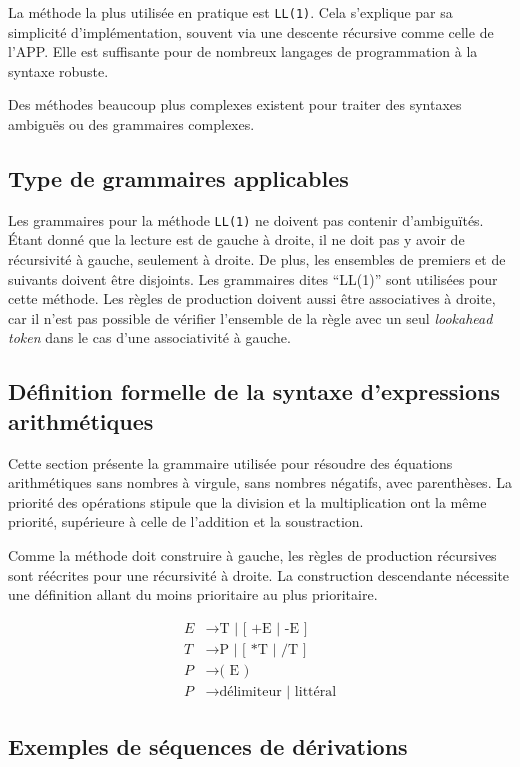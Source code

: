 La méthode la plus utilisée en pratique est \verb|LL(1)|. Cela s'explique par
sa simplicité d'implémentation, souvent via une descente récursive comme
celle de l'APP. Elle est suffisante pour de nombreux langages de
programmation à la syntaxe robuste.

Des méthodes beaucoup plus complexes existent pour traiter des syntaxes
ambiguës ou des grammaires complexes.

\subsection{Type de grammaires applicables}

Les grammaires pour la méthode \verb|LL(1)| ne doivent pas contenir
d’ambiguïtés. Étant donné que la lecture est de gauche à droite, il ne doit
pas y avoir de récursivité à gauche, seulement à droite. De plus, les ensembles
de premiers et de suivants doivent être disjoints. Les grammaires dites
``LL(1)'' sont utilisées pour cette méthode. Les règles de production doivent
aussi être associatives à droite, car il n’est pas possible de vérifier
l'ensemble de la règle avec un seul \textit{lookahead token} dans le cas
d’une associativité à gauche.

\subsection{Définition formelle de la syntaxe d’expressions arithmétiques}

Cette section présente la grammaire utilisée pour résoudre des équations
arithmétiques sans nombres à virgule, sans nombres négatifs, avec parenthèses.
La priorité des opérations stipule que la division et la multiplication ont
la même priorité, supérieure à celle de l'addition et la soustraction.

Comme la méthode doit construire à gauche, les règles de production récursives
sont réécrites pour une récursivité à droite. La construction descendante
nécessite une définition allant du moins prioritaire au plus prioritaire.

\begin{align}
E &\rightarrow \textrm{T | [ +E | -E ]} \\
T &\rightarrow \textrm{P | [ *T | /T ]} \\
P &\rightarrow \textrm{( E )} \\
P &\rightarrow \textrm{délimiteur | littéral}
\end{align}

\subsection{Exemples de séquences de dérivations}

